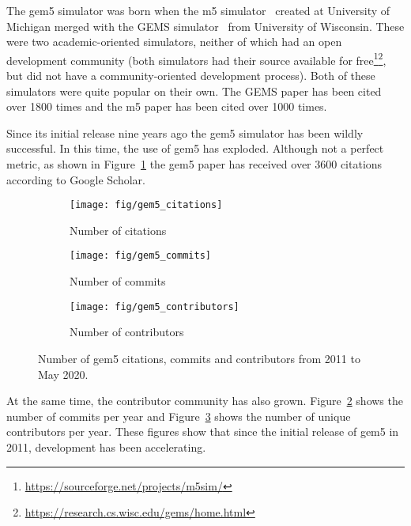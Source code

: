 The gem5 simulator was born when the m5 simulator~\cite{BinkertDHLSR06} created at University of Michigan merged with the GEMS simulator~\cite{MartinSBMXAMHW05} from University of Wisconsin.
These were two academic-oriented simulators, neither of which had an open development community (both simulators had their source available for free\footnote{\url{https://sourceforge.net/projects/m5sim/}}\footnote{\url{https://research.cs.wisc.edu/gems/home.html}}, but did not have a community-oriented development process).
Both of these simulators were quite popular on their own.
The GEMS paper has been cited over 1800 times and the m5 paper has been cited over 1000 times.

Since its initial release nine years ago the gem5 simulator has been wildly successful.
In this time, the use of gem5 has exploded.
Although not a perfect metric, as shown in Figure~\ref{fig:citations} the gem5 paper has received over 3600 citations according to Google Scholar.

\begin{figure}
    \centering
    \begin{subfigure}{0.9\linewidth}
      \centering
      \texttt{[image: fig/gem5\_citations]}
      \caption{Number of citations}
      \label{fig:citations}
    \end{subfigure}

    \begin{subfigure}{0.9\linewidth}
      \centering
      \texttt{[image: fig/gem5\_commits]}
      \caption{Number of commits}
      \label{fig:commits}
    \end{subfigure}

    \begin{subfigure}{0.9\linewidth}
      \centering
      \texttt{[image: fig/gem5\_contributors]}
      \caption{Number of contributors}
      \label{fig:contributors}
    \end{subfigure}
    \caption{Number of gem5 citations, commits and contributors from 2011 to May 2020.}
    \label{fig:gem5_citations_commits_contributors}
\end{figure}

At the same time, the contributor community has also grown.
Figure~\ref{fig:commits} shows the number of commits per year and Figure~\ref{fig:contributors} shows the number of unique contributors per year.
These figures show that since the initial release of gem5 in 2011, development has been accelerating.

